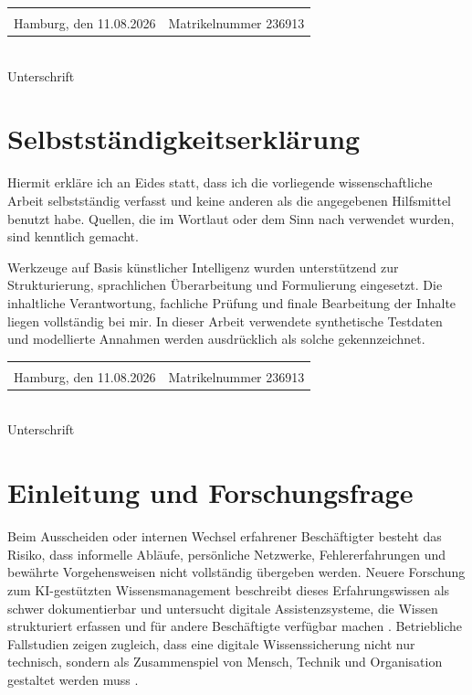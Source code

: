 \documentclass[
  10pt,
  ngerman,
  a4paper,
  toc=graduated,
  numbers=noenddot,
  headings=standardclasses
]{scrartcl}
\begin{document}
\vspace{2cm}
\begin{tabular}{@{}p{6cm}p{6cm}@{}}
\hrulefill & \hrulefill\\
Hamburg, den 11.08.2026 & Matrikelnummer 236913
\end{tabular}

\vspace{2cm}
\hrulefill\\
Unterschrift

\newpage
\section*{Selbstständigkeitserklärung}
Hiermit erkläre ich an Eides statt, dass ich die vorliegende wissenschaftliche Arbeit selbstständig verfasst und keine anderen als die angegebenen Hilfsmittel benutzt habe. Quellen, die im Wortlaut oder dem Sinn nach verwendet wurden, sind kenntlich gemacht.

Werkzeuge auf Basis künstlicher Intelligenz wurden unterstützend zur Strukturierung, sprachlichen Überarbeitung und Formulierung eingesetzt. Die inhaltliche Verantwortung, fachliche Prüfung und finale Bearbeitung der Inhalte liegen vollständig bei mir. In dieser Arbeit verwendete synthetische Testdaten und modellierte Annahmen werden ausdrücklich als solche gekennzeichnet.

\vspace{2cm}
\begin{tabular}{@{}p{6cm}p{6cm}@{}}
\hrulefill & \hrulefill\\
Hamburg, den 11.08.2026 & Matrikelnummer 236913
\end{tabular}

\vspace{2cm}
\hrulefill\\
Unterschrift

\newpage
\listoftables
{}

\newpage
{}
\setcounter{page}{1}

\section{Einleitung und Forschungsfrage}

Beim Ausscheiden oder internen Wechsel erfahrener Beschäftigter besteht das Risiko, dass informelle Abläufe, persönliche Netzwerke, Fehlererfahrungen und bewährte Vorgehensweisen nicht vollständig übergeben werden. Neuere Forschung zum KI-gestützten Wissensmanagement beschreibt dieses Erfahrungswissen als schwer dokumentierbar und untersucht digitale Assistenzsysteme, die Wissen strukturiert erfassen und für andere Beschäftigte verfügbar machen \cite[S.~1--7]{ottersboeck_urban_2026}. Betriebliche Fallstudien zeigen zugleich, dass eine digitale Wissenssicherung nicht nur technisch, sondern als Zusammenspiel von Mensch, Technik und Organisation gestaltet werden muss \cite[S.~23--28]{boehme_nedz_2023}.
\end{document}
